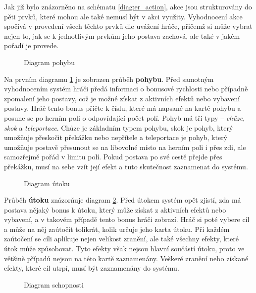 Jak již bylo znázorněno na schématu \ref{diag:er_action}, akce jsou strukturovány do pěti prvků, které mohou ale také nemusí být v akci využity. Vyhodnocení akce spočívá v provedení všech těchto prvků dle uvážení hráče, přičemž si může vybrat nejen to, jak se k jednotlivým prvkům jeho postava zachová, ale také v jakém pořadí je provede.

\begin{figure}[h]
    \centering
    \caption{Diagram pohybu}
    \label{diag:movement}
\end{figure}

Na prvním diagramu \ref{diag:movement} je zobrazen průběh \textbf{pohybu}. Před samotným vyhodnocením systém hráči předá informaci o bonusové rychlosti nebo případně zpomalení jeho postavy, což je možné získat z aktivních efektů nebo vybavení postavy. Hráč tento bonus přičte k číslu, které má napsané na kartě pohybu a posune se po herním poli o odpovídající počet polí. Pohyb má tři typy -- \textit{chůze}, \textit{skok} a \textit{teleportace}. Chůze je základním typem pohybu, skok je pohyb, který umožňuje přeskočit překážku nebo nepřítele a teleportace je pohyb, který umožňuje postavě přesunout se na libovolné místo na herním poli i přes zdi, ale samozřejmě pořád v limitu polí. Pokud postava po své cestě přejde přes překážku, musí na sebe vzít její efekt a tuto skutečnost zaznamenat do systému.

\begin{figure}[h]
    \centering
    \caption{Diagram útoku}
    \label{diag:attack}
\end{figure}

Průběh \textbf{útoku} znázorňuje diagram \ref{diag:attack}. Před útokem systém opět zjistí, zda má postava nějaký bonus k útoku, který může získat z aktivních efektů nebo vybavení, a v takovém případě tento bonus hráči zobrazí. Hráč si poté vybere cíl a může na něj zaútočit tolikrát, kolik určuje jeho karta útoku. Při každém zaútočení se cíli aplikuje nejen velikost zranění, ale také všechny efekty, které útok může způsobovat. Tyto efekty však nejsou hlavní součástí útoku, proto ve většině případů nejsou na této kartě zaznamenány. Veškeré zranění nebo získané efekty, které cíl utrpí, musí být zaznamenány do systému.

\begin{figure}[h]
    \centering
    \caption{Diagram schopnosti}
    \label{diag:skill}
\end{figure}

